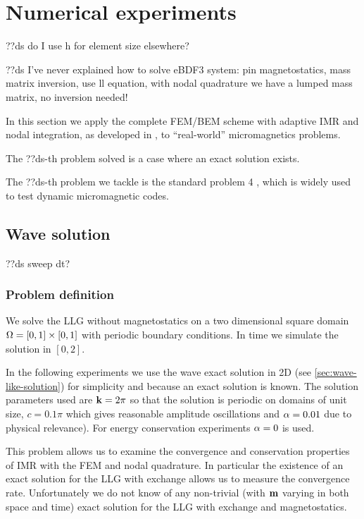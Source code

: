\chapter{Numerical experiments}
\label{cha:numer-experiments}

??ds do I use h for element size elsewhere?

??ds I've never explained how to solve eBDF3 system: pin magnetostatics, mass matrix inversion, use ll equation, with nodal quadrature we have a lumped mass matrix, no inversion needed!

In this section we apply the complete FEM/BEM scheme with adaptive IMR and nodal integration, as developed in , to ``real-world'' micromagnetics problems.

The ??ds-th problem solved is a case where an exact solution exists.

The ??ds-th problem we tackle is the \mumag standard problem 4 \cite{mumag-website}, which is widely used to test dynamic micromagnetic codes.



\section{Wave solution}
\label{sec:numer-exper}


??ds sweep dt?

\subsection{Problem definition}

We solve the LLG without magnetostatics on a two dimensional square domain $\Omega = [0,1] \times [0,1]$ with periodic boundary conditions. 
In time we simulate the solution in $[0, 2]$.

In the following experiments we use the wave exact solution in 2D (see \cref{sec:wave-like-solution}) for simplicity and because an exact solution is known.
The solution parameters used are $\mathbf{k} = 2\pi$ so that the solution is periodic on domains of unit size, $c = 0.1\pi$ which gives reasonable amplitude oscillations and $\alpha = 0.01$ due to physical relevance).
For energy conservation experiments $\alpha = 0$ is used.


This problem allows us to examine the convergence and conservation properties of IMR with the FEM and nodal quadrature.
In particular the existence of an exact solution for the LLG with exchange allows us to measure the convergence rate.
Unfortunately we do not know of any non-trivial (\ie with $\mathbf{m}$ varying in both space and time) exact solution for the LLG with exchange and magnetostatics.
  

